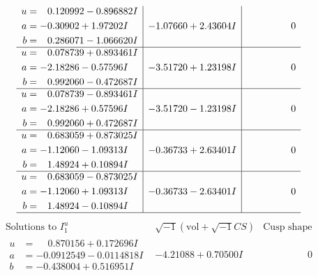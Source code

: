 \documentclass[1p]{elsarticle_modified}
\theoremstyle{definition}
\newcommand{\I}{\sqrt{-1}}
\begin{document}
$$\begin{array}{c|c|c}
\begin{aligned}
u &= \phantom{-}0.120992 - 0.896882 I \\
a &= -0.30902 + 1.97202 I \\
b &= \phantom{-}0.286071 - 1.066620 I\end{aligned}
 & -1.07660 + 2.43604 I & \phantom{-0.000000 } 0 \\ \hline\begin{aligned}
u &= \phantom{-}0.078739 + 0.893461 I \\
a &= -2.18286 - 0.57596 I \\
b &= \phantom{-}0.992060 - 0.472687 I\end{aligned}
 & -3.51720 + 1.23198 I & \phantom{-0.000000 } 0 \\ \hline\begin{aligned}
u &= \phantom{-}0.078739 - 0.893461 I \\
a &= -2.18286 + 0.57596 I \\
b &= \phantom{-}0.992060 + 0.472687 I\end{aligned}
 & -3.51720 - 1.23198 I & \phantom{-0.000000 } 0 \\ \hline\begin{aligned}
u &= \phantom{-}0.683059 + 0.873025 I \\
a &= -1.12060 - 1.09313 I \\
b &= \phantom{-}1.48924 + 0.10894 I\end{aligned}
 & -0.36733 + 2.63401 I & \phantom{-0.000000 } 0 \\ \hline\begin{aligned}
u &= \phantom{-}0.683059 - 0.873025 I \\
a &= -1.12060 + 1.09313 I \\
b &= \phantom{-}1.48924 - 0.10894 I\end{aligned}
 & -0.36733 - 2.63401 I & \phantom{-0.000000 } 0\\
 \hline 
 \end{array}$$\newpage$$\begin{array}{c|c|c}  
\text{Solutions to }I^u_{1}& \I (\text{vol} + \sqrt{-1}CS) & \text{Cusp shape}\\
 \hline 
\begin{aligned}
u &= \phantom{-}0.870156 + 0.172696 I \\
a &= -0.0912549 - 0.0114818 I \\
b &= -0.438004 + 0.516951 I\end{aligned}
 & -4.21088 + 0.70500 I & \phantom{-0.000000 } 0 \\ \hline\begin{aligned}

\end{aligned}
\end{array}$$
\end{document}
